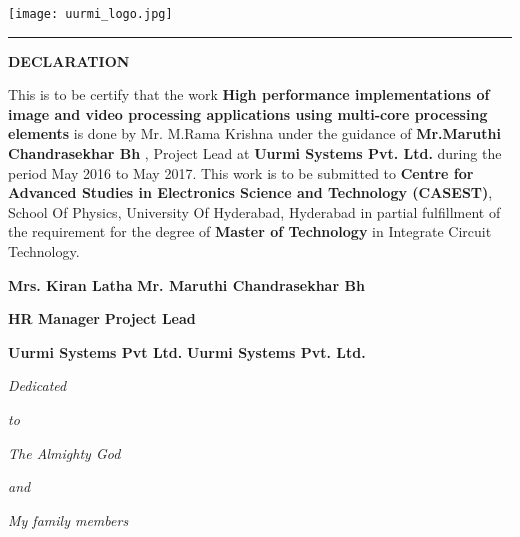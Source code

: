 \newpage
{\flushright
	\texttt{[image: uurmi\_logo.jpg]}\\
}
{\centering
\rule{\textwidth}{2pt}
\begin{center}
	\textbf{DECLARATION}
\end{center}}
This is to be certify that the work \textbf{High performance implementations of image and video processing applications using multi-core processing elements} is done by
Mr. M.Rama Krishna under the guidance of \textbf{Mr.Maruthi Chandrasekhar Bh} , Project Lead
at \textbf{Uurmi Systems Pvt. Ltd.} during the period May 2016 to May 2017. This work
is to be submitted to \textbf{Centre for Advanced Studies in Electronics Science and
Technology (CASEST)}, School Of Physics, University Of Hyderabad, Hyderabad
in partial fulfillment of the requirement for the degree of \textbf{Master of Technology} in
Integrate Circuit Technology.\\
\vspace{5cm}
\par
\textbf{Mrs. Kiran Latha }          \hfill     \textbf{Mr. Maruthi Chandrasekhar Bh}\par
\textbf{HR Manager }                \hspace{3.2cm}     \textbf{Project Lead}\par
\textbf{Uurmi Systems Pvt Ltd.  }    \hspace{0.7cm}    \textbf{Uurmi Systems Pvt. Ltd.}\par


{\large \centering
\newpage
\null\vspace{8cm}
\textit{Dedicated}\par 
\textit{to} \par
\textit{The Almighty God} \par
\textit{and} \par
\textit{My family members}\par}
